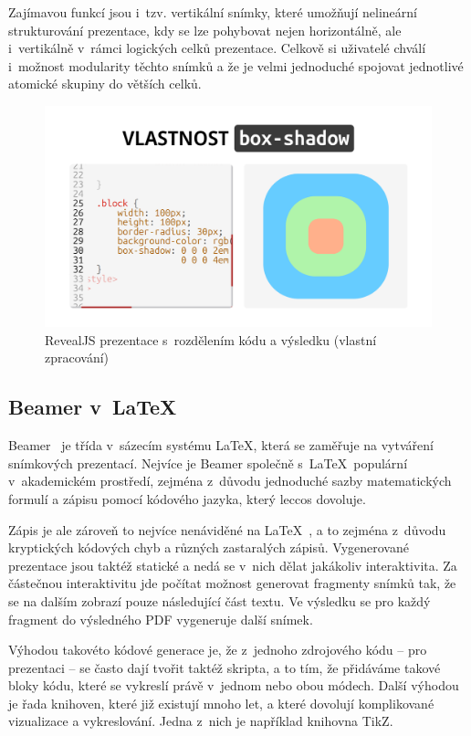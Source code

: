 Zajímavou funkcí jsou i~tzv. vertikální snímky, které umožňují nelineární strukturování prezentace, kdy se lze pohybovat nejen horizontálně, ale i~vertikálně v~rámci logických celků prezentace.
Celkově si uživatelé chválí i~možnost modularity těchto snímků a že je velmi jednoduché spojovat jednotlivé atomické skupiny do větších celků.


\begin{figure}[ht!]
    \centering
    \includegraphics[width=0.9\linewidth]{media/03_analyza/revealjs.png}
    \caption[RevealJS prezentace s~rozdělením kódu a výsledku]{RevealJS prezentace s~rozdělením kódu a výsledku (vlastní zpracování)}\label{fig:analyza:revealjs-ukazka}
\end{figure}

\subsection{Beamer v~\LaTeX}

Beamer~\cite{beamer} je třída v~sázecím systému \LaTeX, která se zaměřuje na vytváření snímkových prezentací.
Nejvíce je Beamer společně s~\LaTeX~populární v~akademickém prostředí, zejména z~důvodu jednoduché sazby matematických formulí a zápisu pomocí kódového jazyka, který leccos dovoluje. 

Zápis je ale zároveň to nejvíce nenáviděné na \LaTeX~\cite{latex_reddit}, a to zejména z~důvodu kryptických kódových chyb a různých zastaralých zápisů.
Vygenerované prezentace jsou taktéž statické a nedá se v~nich dělat jakákoliv interaktivita. 
Za částečnou interaktivitu jde počítat možnost generovat fragmenty snímků tak, že se na dalším zobrazí pouze následující část textu.
Ve výsledku se pro každý fragment do výsledného PDF vygeneruje další snímek.

Výhodou takovéto kódové generace je, že z~jednoho zdrojového kódu -- pro prezentaci -- se často dají tvořit taktéž skripta, a to tím, že přidáváme takové bloky kódu, které se vykreslí právě v~jednom nebo obou módech.
Další výhodou je řada knihoven, které již existují mnoho let, a které dovolují komplikované vizualizace a vykreslování.
Jedna z~nich je například knihovna TikZ. 

